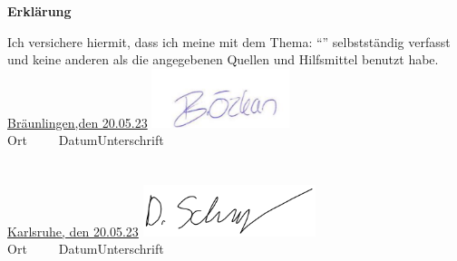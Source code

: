 

\newpage
\thispagestyle{empty}
\begin{framed}
\begin{center}
\Large\bfseries Erklärung
\end{center}
\medskip
\noindent
Ich versichere hiermit, dass ich meine \Was mit dem Thema:
\enquote{\Titel} selbstständig verfasst und keine anderen als die angegebenen Quellen und Hilfsmittel benutzt habe. \newline
\vspace{2cm}
\linebreak
\noindent
\underline{Bräunlingen,den 20.05.23} \hfill\underline{\hspace{2.2cm}\includegraphics[width=4cm]{images//buraksign.png}}\\
Ort~~~~~Datum\hfill Unterschrift\hspace{4cm}
\\\\\\
 \underline{Karlsruhe, den 20.05.23} \hfill\underline{\hspace{1.1cm} \includegraphics[height=1.5cm] {images/dSchomburg.png}}\\
Ort~~~~~Datum\hfill Unterschrift\hspace{4cm}
\end{framed}

